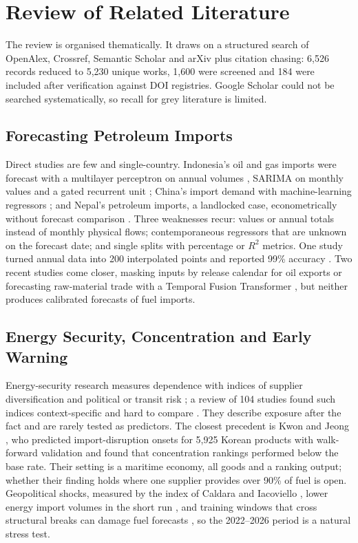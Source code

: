 \documentclass[conference]{IEEEtran}
\begin{document}
\section{Review of Related Literature}\label{sec:lit}
The review is organised thematically. It draws on a structured search of OpenAlex, Crossref, Semantic Scholar and arXiv plus citation chasing: 6,526 records reduced to 5,230 unique works, 1,600 were screened and 184 were included after verification against DOI registries. Google Scholar could not be searched systematically, so recall for grey literature is limited.

\subsection{Forecasting Petroleum Imports}
Direct studies are few and single-country. Indonesia's oil and gas imports were forecast with a multilayer perceptron on annual volumes \cite{wanto2019}, SARIMA on monthly values \cite{santi2023} and a gated recurrent unit \cite{saputra2024}; China's import demand with machine-learning regressors \cite{qin2026}; and Nepal's petroleum imports, a landlocked case, econometrically without forecast comparison \cite{pradhan2023}. Three weaknesses recur: values or annual totals instead of monthly physical flows; contemporaneous regressors that are unknown on the forecast date; and single splits with percentage or $R^2$ metrics. One study turned annual data into 200 interpolated points and reported 99\% accuracy \cite{khajoui2024}. Two recent studies come closer, masking inputs by release calendar for oil exports \cite{intarasat2026} or forecasting raw-material trade with a Temporal Fusion Transformer \cite{arrar2025}, but neither produces calibrated forecasts of fuel imports.

\subsection{Energy Security, Concentration and Early Warning}
Energy-security research measures dependence with indices of supplier diversification \cite{cohen2011} and political or transit risk \cite{lecoq2009}; a review of 104 studies found such indices context-specific and hard to compare \cite{ang2015}. They describe exposure after the fact and are rarely tested as predictors. The closest precedent is Kwon and Jeong \cite{kwon2026}, who predicted import-disruption onsets for 5,925 Korean products with walk-forward validation and found that concentration rankings performed below the base rate. Their setting is a maritime economy, all goods and a ranking output; whether their finding holds where one supplier provides over 90\% of fuel is open. Geopolitical shocks, measured by the index of Caldara and Iacoviello \cite{caldara2022}, lower energy import volumes in the short run \cite{lin2025}, and training windows that cross structural breaks can damage fuel forecasts \cite{li2022}, so the 2022--2026 period is a natural stress test.
\end{document}
